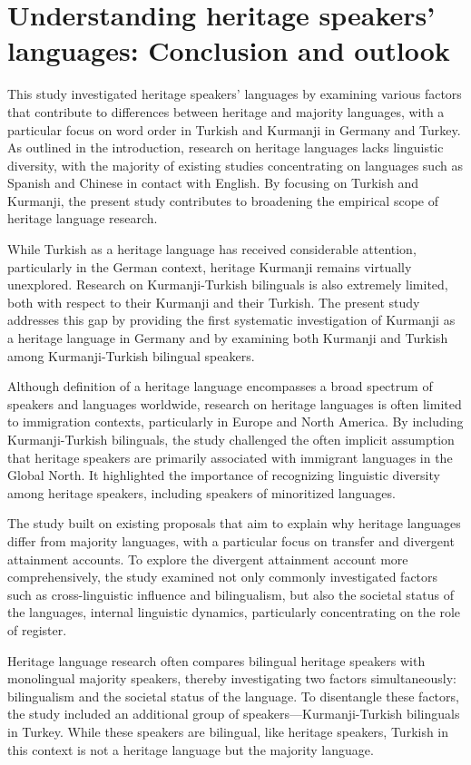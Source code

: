 \chapter{Understanding heritage speakers’ languages: Conclusion and outlook}\label{chap:key:8}

This study investigated heritage speakers’ languages by examining various factors that contribute to differences between heritage and majority languages, with a particular focus on word order in Turkish and Kurmanji in Germany and Turkey. As outlined in the introduction, research on heritage languages lacks linguistic diversity, with the majority of existing studies concentrating on languages such as Spanish and Chinese in contact with English. By focusing on Turkish and Kurmanji, the present study contributes to broadening the empirical scope of heritage language research.

While Turkish as a heritage language has received considerable attention, particularly in the German context, heritage Kurmanji remains virtually unexplored. Research on Kurmanji-Turkish bilinguals is also extremely limited, both with respect to their Kurmanji and their Turkish. The present study addresses this gap by providing the first systematic investigation of Kurmanji as a heritage language in Germany and by examining both Kurmanji and Turkish among Kurmanji-Turkish bilingual speakers.

Although  definition of a heritage language encompasses a broad spectrum of speakers and languages worldwide, research on heritage languages is often limited to immigration contexts, particularly in Europe and North America. By including Kurmanji-Turkish bilinguals, the study challenged the often implicit assumption that heritage speakers are primarily associated with immigrant languages in the Global North. It highlighted the importance of recognizing linguistic diversity among heritage speakers, including speakers of minoritized languages.

The study built on existing proposals that aim to explain why heritage languages differ from majority languages, with a particular focus on transfer and divergent attainment accounts. To explore the divergent attainment account more comprehensively, the study examined not only commonly investigated factors such as cross-linguistic influence and bilingualism, but also the societal status of the languages, internal linguistic dynamics, particularly concentrating on the role of register.

Heritage language research often compares bilingual heritage speakers with monolingual majority speakers, thereby investigating two factors simultaneously: bilingualism and the societal status of the language. To disentangle these factors, the study included an additional group of speakers—Kurmanji-Turkish bilinguals in Turkey. While these speakers are bilingual, like heritage speakers, Turkish in this context is not a heritage language but the majority language.

